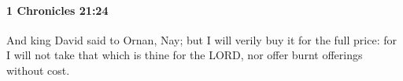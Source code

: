 
		\paragraph{1 Chronicles 21:24} %
			\label{1CHRONICLES-21-24}

			And king David said to Ornan, Nay; but I will verily buy it for the full price: for I will not take that which is thine for the LORD, nor offer burnt offerings without cost.



